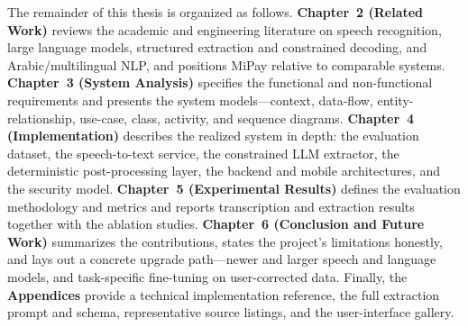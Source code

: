 The remainder of this thesis is organized as follows.
\textbf{Chapter~2 (Related Work)} reviews the academic and engineering literature
on speech recognition, large language models, structured extraction and
constrained decoding, and Arabic/multilingual NLP, and positions MiPay relative
to comparable systems.
\textbf{Chapter~3 (System Analysis)} specifies the functional and
non-functional requirements and presents the system models---context, data-flow,
entity-relationship, use-case, class, activity, and sequence diagrams.
\textbf{Chapter~4 (Implementation)} describes the realized system in depth: the
evaluation dataset, the speech-to-text service, the constrained LLM extractor,
the deterministic post-processing layer, the backend and mobile architectures,
and the security model.
\textbf{Chapter~5 (Experimental Results)} defines the evaluation methodology and
metrics and reports transcription and extraction results together with the
ablation studies.
\textbf{Chapter~6 (Conclusion and Future Work)} summarizes the contributions,
states the project's limitations honestly, and lays out a concrete upgrade
path---newer and larger speech and language models, and task-specific
fine-tuning on user-corrected data.
Finally, the \textbf{Appendices} provide a technical implementation reference,
the full extraction prompt and schema, representative source listings, and the
user-interface gallery.
